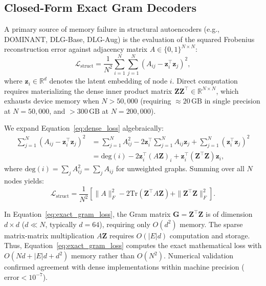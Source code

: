 \documentclass[applsci,article,submit,moreauthors,pdftex]{Definitions/mdpi}
\begin{document}
\subsection{Closed-Form Exact Gram Decoders}
A primary source of memory failure in structural autoencoders (e.g., DOMINANT, DLG-Base, DLG-Aug) is the evaluation of the squared Frobenius reconstruction error against adjacency matrix $A \in \{0, 1\}^{N \times N}$:
\begin{equation}
\mathcal{L}_{\mathrm{struct}} = \frac{1}{N^2} \sum_{i=1}^N \sum_{j=1}^N \left(A_{ij} - \mathbf{z}_i^\top \mathbf{z}_j\right)^2,
\label{eq:dense_loss}
\end{equation}
where $\mathbf{z}_i \in \mathbb{R}^d$ denotes the latent embedding of node $i$. Direct computation requires materializing the dense inner product matrix $\mathbf{Z} \mathbf{Z}^\top \in \mathbb{R}^{N \times N}$, which exhausts device memory when $N > 50,000$ (requiring $\approx 20\,\text{GB}$ in single precision at $N=50,000$, and $>300\,\text{GB}$ at $N=200,000$).

We expand Equation~\eqref{eq:dense_loss} algebraically:
\begin{align}
\sum_{j=1}^N \left(A_{ij} - \mathbf{z}_i^\top \mathbf{z}_j\right)^2 &= \sum_{j=1}^N A_{ij}^2 - 2 \mathbf{z}_i^\top \sum_{j=1}^N A_{ij} \mathbf{z}_j + \sum_{j=1}^N (\mathbf{z}_i^\top \mathbf{z}_j)^2 \nonumber \\
&= \mathrm{deg}(i) - 2 \mathbf{z}_i^\top \left(A \mathbf{Z}\right)_i + \mathbf{z}_i^\top \left(\mathbf{Z}^\top \mathbf{Z}\right) \mathbf{z}_i,
\label{eq:gram_identity}
\end{align}
where $\mathrm{deg}(i) = \sum_j A_{ij}^2 = \sum_j A_{ij}$ for unweighted graphs. Summing over all $N$ nodes yields:
\begin{equation}
\mathcal{L}_{\mathrm{struct}} = \frac{1}{N^2} \left[ \|A\|_F^2 - 2 \mathrm{Tr}\left(\mathbf{Z}^\top A \mathbf{Z}\right) + \|\mathbf{Z}^\top \mathbf{Z}\|_F^2 \right].
\label{eq:exact_gram_loss}
\end{equation}

In Equation~\eqref{eq:exact_gram_loss}, the Gram matrix $\mathbf{G} = \mathbf{Z}^\top \mathbf{Z}$ is of dimension $d \times d$ ($d \ll N$, typically $d=64$), requiring only $O(d^2)$ memory. The sparse matrix-matrix multiplication $A \mathbf{Z}$ requires $O(|E|d)$ computation and storage. Thus, Equation~\eqref{eq:exact_gram_loss} computes the exact mathematical loss with $O(N d + |E| d + d^2)$ memory rather than $O(N^2)$. Numerical validation confirmed agreement with dense implementations within machine precision ($\text{error} < 10^{-7}$).
\end{document}
